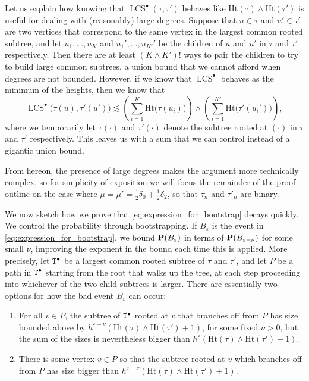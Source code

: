\documentclass[11pt,reqno]{amsart}
\newcommand{\Ht}{\mathrm{Ht}}
\newcommand{\LCS}{\operatorname{LCS}}
\newcommand{\eps}{\varepsilon}
\begin{document}
Let us explain how knowing that $\LCS^\bullet(\tau,\tau')$ behaves like $\Ht(\tau) \wedge \Ht(\tau')$ is useful for dealing with (reasonably) large degrees. Suppose that $u \in \tau$ and $u' \in \tau'$ are two vertices that correspond to the same vertex in the largest common rooted subtree, and let $u_1,\ldots,u_K$ and $u_1',\ldots,u_{K'}'$ be the children of $u$ and $u'$ in $\tau$ and $\tau'$ respectively. Then there are at least $(K \wedge K')!$ ways to pair the children to try to build large common subtrees, a union bound that we cannot afford when degrees are not bounded. However, if we know that $\LCS^\bullet$ behaves as the minimum of the heights, then we know that 
$$
\LCS^\bullet\big(\tau(u),\tau'(u')\big) \lesssim \left(\sum_{i=1}^{K} \Ht\big(\tau(u_i)\big)\right) \wedge \left(\sum_{i=1}^{K'} \Ht\big(\tau'(u_i')\big)\right),
$$
where we temporarily let $\tau(\cdot)$ and $\tau'(\cdot)$ denote the subtree rooted at $(\cdot)$ in $\tau$ and $\tau'$ respectively. This leaves us with a sum that we can control instead of a gigantic union bound. 
\smallskip

From hereon, the presence of large degrees makes the argument more technically complex, so for simplicity of exposition we will focus the remainder of the proof outline on the case where $\mu=\mu'=\tfrac{1}{2}\delta_0+\tfrac{1}{2} \delta_2$, so that $\tau_n$ and $\tau'_n$ are binary.
\smallskip

We now sketch how we prove that \eqref{eq:expression_for_bootstrap} decays quickly. 
We control the probability through bootstrapping. 
If $B_\eps$ is the event in \eqref{eq:expression_for_bootstrap}, we bound $\prob(B_\eps)$ in terms of $\prob(B_{\eps-\nu})$ for some small $\nu$, improving the exponent in the bound each time this is applied. 
More precisely, let $\mathtt{T}^\bullet$ be a largest common rooted subtree of $\tau$ and $\tau'$, and let $P$ be a path in $\mathtt{T}^\bullet$ starting from the root that walks up the tree, at each step proceeding into whichever of the two child subtrees is larger.
There are essentially two options for how the bad event $B_\eps$ can occur:
\begin{enumerate}
    \setlength{\itemsep}{0.01em}
    \item[(i)] For all $v \in P$, the subtree of $\mathtt{T}^\bullet$ rooted at $v$ that branches off from $P$ has size bounded above by $h^{\varepsilon-\nu}(\Ht(\tau) \wedge \Ht(\tau')+1)$, for some fixed $\nu>0$, but the sum of the sizes is nevertheless bigger than $h^\varepsilon (\Ht(\tau) \wedge \Ht(\tau')+1)$.
    \item[(ii)] There is some vertex $v\in P$ so that the subtree rooted at $v$ which branches off from $P$ has size bigger than $h^{\varepsilon-\nu}(\Ht(\tau) \wedge \Ht(\tau')+1)$.
\end{enumerate}
\end{document}
